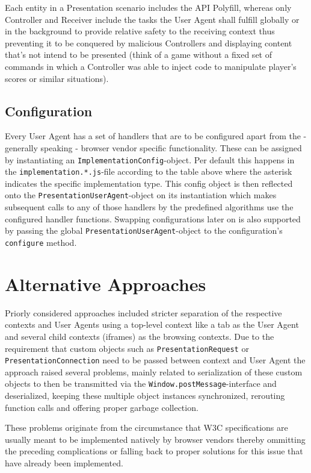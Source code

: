 \documentclass[journal]{IEEEtran}
\begin{document}
Each entity in a Presentation scenario includes the API Polyfill, whereas only Controller and Receiver include the tasks the User Agent shall fulfill globally or in the background to provide relative safety to the receiving context thus preventing it to be conquered by malicious Controllers and displaying content that's not intend to be presented (think of a game without a fixed set of commands in which a Controller was able to inject code to manipulate player's scores or similar situations).
\subsection{Configuration}
\label{configuration}
Every User Agent has a set of handlers that are to be configured apart from the - generally speaking - browser vendor specific functionality. These can be assigned by instantiating an  {\lstinline[style=inline]$ImplementationConfig$}-object. Per default this happens in the  {\lstinline[style=inline]$implementation.*.js$}-file according to the table above where the asterisk indicates the specific implementation type. This config object is then reflected onto the  {\lstinline[style=inline]$PresentationUserAgent$}-object on its instantiation which makes subsequent calls to any of those handlers by the predefined algorithms use the configured handler functions. Swapping configurations later on is also supported by passing the global  {\lstinline[style=inline]$PresentationUserAgent$}-object to the configuration's  {\lstinline[style=inline]$configure$} method.
\section{Alternative Approaches}
\label{alternative approaches}
Priorly considered approaches included stricter separation of the respective contexts and User Agents using a top-level context like a tab as the User Agent and several child contexts (iframes) as the browsing contexts. Due to the requirement that custom objects such as  {\lstinline[style=inline]$PresentationRequest$} or  {\lstinline[style=inline]$PresentationConnection$} need to be passed between context and User Agent the approach raised several problems, mainly related to serialization of these custom objects to then be transmitted via the  {\lstinline[style=inline]$Window.postMessage$}-interface and deserialized, keeping these multiple object instances synchronized, rerouting function calls and offering proper garbage collection.

These problems originate from the circumstance that W3C specifications are usually meant to be implemented natively by browser vendors thereby ommitting the preceding complications or falling back to proper solutions for this issue that have already been implemented.
\end{document}
